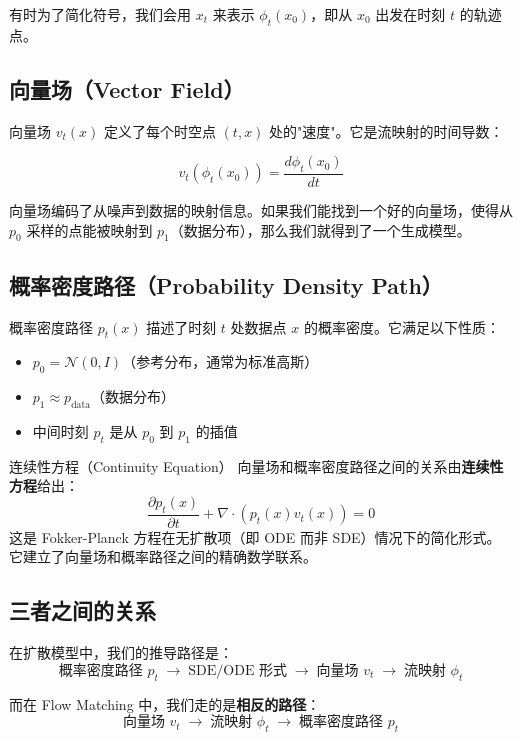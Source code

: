 有时为了简化符号，我们会用 $x_t$ 来表示 $\phi_t(x_0)$，即从 $x_0$ 出发在时刻 $t$ 的轨迹点。

\subsection{向量场（Vector Field）}

向量场 $v_t(x)$ 定义了每个时空点 $(t, x)$ 处的"速度"。它是流映射的时间导数：

$$v_t(\phi_t(x_0)) = \frac{d\phi_t(x_0)}{dt}$$

向量场编码了从噪声到数据的映射信息。如果我们能找到一个好的向量场，使得从 $p_0$ 采样的点能被映射到 $p_1$（数据分布），那么我们就得到了一个生成模型。

\subsection{概率密度路径（Probability Density Path）}

概率密度路径 $p_t(x)$ 描述了时刻 $t$ 处数据点 $x$ 的概率密度。它满足以下性质：
\begin{itemize}
    \item $p_0 = \mathcal{N}(0, I)$（参考分布，通常为标准高斯）
    \item $p_1 \approx p_{\text{data}}$（数据分布）
    \item 中间时刻 $p_t$ 是从 $p_0$ 到 $p_1$ 的插值
\end{itemize}

\begin{knowledgebox}{连续性方程（Continuity Equation）}
向量场和概率密度路径之间的关系由\textbf{连续性方程}给出：
$$\frac{\partial p_t(x)}{\partial t} + \nabla \cdot (p_t(x) v_t(x)) = 0$$
这是 Fokker-Planck 方程在无扩散项（即 ODE 而非 SDE）情况下的简化形式。它建立了向量场和概率路径之间的精确数学联系。
\end{knowledgebox}

\subsection{三者之间的关系}

在扩散模型中，我们的推导路径是：
$$\text{概率密度路径 } p_t \;\longrightarrow\; \text{SDE/ODE 形式} \;\longrightarrow\; \text{向量场 } v_t \;\longrightarrow\; \text{流映射 } \phi_t$$

而在 Flow Matching 中，我们走的是\textbf{相反的路径}：
$$\text{向量场 } v_t \;\longrightarrow\; \text{流映射 } \phi_t \;\longrightarrow\; \text{概率密度路径 } p_t$$

